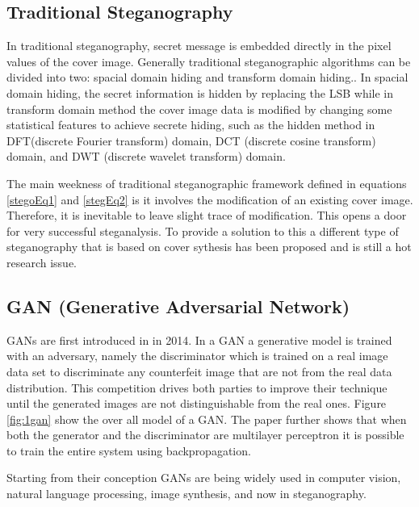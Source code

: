 \documentclass[../main/main.tex]{subfiles}
\begin{document}
	\subsection{Traditional Steganography}
	In traditional steganography, secret message is embedded directly in the pixel values of the cover image. Generally traditional steganographic algorithms can be divided into two: spacial domain hiding and transform domain hiding.\cite{Liu2018}. In spacial domain hiding, the secret information is hidden by replacing the \gls{LSB}\cite{Liu2018} while in transform domain method the cover image data is modified by changing some statistical features to achieve secrete hiding, such as the hidden method in \gls{DFT}(discrete Fourier transform) domain, \gls{DCT} (discrete cosine transform) domain, and \gls{DWT} (discrete wavelet transform) domain. 
	
	The main weekness of traditional steganographic framework defined in equations \ref{stegoEq1} and \ref{stegEq2} is it involves the modification of an existing cover image. Therefore, it is inevitable to leave slight trace of modification. This opens a door for very successful steganalysis. To provide a solution to this a different type of steganography that is based on cover sythesis has been proposed and is still a hot research issue.\cite{Hu2018} 
	
	\subsection{\gls{GAN} (Generative Adversarial Network)}
	 
	 \gls{GAN}s are first introduced in \cite{goodfellow2014generative} in 2014. In a \gls{GAN} a generative model is trained with an adversary, namely the discriminator  which is trained on a real image data set to discriminate any counterfeit image that are not from the real data distribution. This competition drives both parties to improve their technique until the generated images are not distinguishable from the real ones. Figure \ref{fig:1gan} show the over all model of a \gls{GAN}. The paper \cite{goodfellow2014generative} further shows that when both the generator and the discriminator are multilayer perceptron it is possible to train the entire system using backpropagation.  
	
	Starting from their conception \gls{GAN}s are being widely used in computer vision, natural language processing, image synthesis, and now in steganography. \cite{Zhang2019} 
\end{document}
